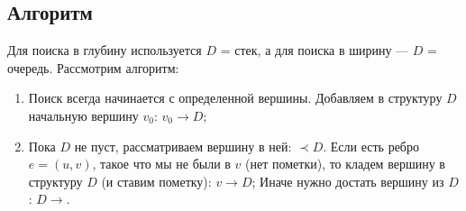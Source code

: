 \documentclass[russian]{lecture-notes}
\begin{document}
	\subsection{Алгоритм}
	Для поиска в глубину используется $D$ = стек, а для поиска в ширину --- $D$ = очередь. Рассмотрим алгоритм:
	\begin{enumerate}
		\item Поиск всегда начинается с определенной вершины. Добавляем в структуру $D$ начальную вершину $v_0$: $v_0 \rightarrow D$;
		\item Пока $D$ не пуст, рассматриваем вершину в ней: $\prec D$.
		\subitem Если есть ребро $e = (u,v)$, такое что мы не были в $v$ (нет пометки), то кладем вершину в структуру $D$ (и ставим пометку): $v \rightarrow D$;
		\subitem Иначе нужно достать вершину из $D$: $D \rightarrow$.
	\end{enumerate}
	
\end{document}
